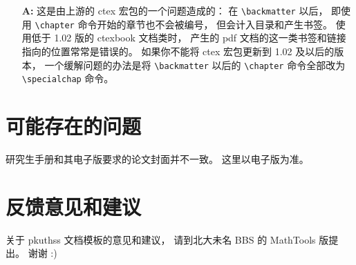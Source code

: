 \begin{enumerate}
		\item[\textbf{A:}]
		这是由上游的 ctex 宏包的一个问题造成的：
		在 \verb|\backmatter| 以后，
		即使用 \verb|\chapter| 命令开始的章节也不会被编号，
		但会计入目录和产生书签。
		使用低于 1.02 版的 ctexbook 文档类时，
		产生的 pdf 文档的这一类书签和链接指向的位置常常是错误的。
		如果你不能将 ctex 宏包更新到 1.02 及以后的版本，
		一个缓解问题的办法是将 \verb|\backmatter| 以后的 %
		\verb|\chapter| 命令全部改为 \verb|\specialchap| 命令。
	\end{enumerate}

	\section{可能存在的问题}

	研究生手册和其电子版\cite{pku-thesisstyle}要求的论文封面并不一致。
	这里以电子版为准。

	\section{反馈意见和建议}

	关于 pkuthss 文档模板的意见和建议，
	请到北大未名 BBS 的 MathTools 版提出。
	谢谢 :)

